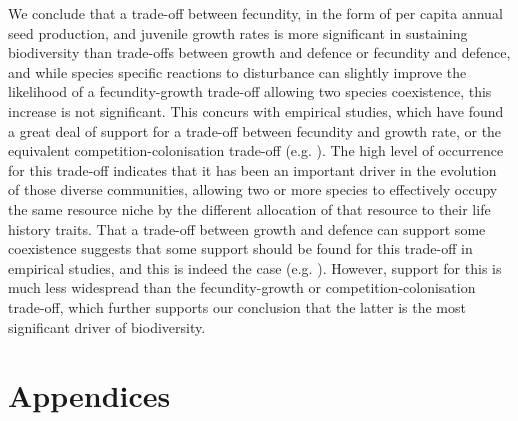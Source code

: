\documentclass[preprint,10pt,reqno]{report}
\makeatletter
\newcounter{appendix}[chapter]
\newcommand\bappendix{%
  \addtocontents{toc}{\protect\addvspace{10pt}Appendices}
  \begingroup
  \renewcommand\section{\stepcounter{appendix}%
    \renewcommand\thesection{\thechapter.\Alph{appendix}}
    \@startsection {section}{1}{\z@}%
      {-3.5ex \@plus -1ex \@minus -.2ex}%
      {2.3ex \@plus.2ex}%
      {\normalfont\Large\bfseries}}}
\makeatother
\begin{document}
We conclude that a trade-off between fecundity, in the form of per capita annual seed production, and juvenile growth rates is more significant in sustaining biodiversity than trade-offs between growth and defence or fecundity and defence, and while species specific reactions to disturbance can slightly improve the likelihood of a fecundity-growth trade-off allowing two species coexistence, this increase is not significant. This concurs with empirical studies, which have found a great deal of support for a trade-off between fecundity and growth rate, or the equivalent competition-colonisation trade-off (e.g. \cite{levins1971regional,yu2001competition,tilman1994competition,adler2000space}). The high level of occurrence for this trade-off indicates that it has been an important driver in the evolution of those diverse communities, allowing two or more species to effectively occupy the same resource niche by the different allocation of that resource to their life history traits. That a trade-off between growth and defence can support some coexistence suggests that some support should be found for this trade-off in empirical studies, and this is indeed the case (e.g. \cite{wright2010functional,fine2006growth}). However, support for this is much less widespread than the fecundity-growth or competition-colonisation trade-off, which further supports our conclusion that the latter is the most significant driver of biodiversity.

\section*{Appendices}

\bappendix
\end{document}
